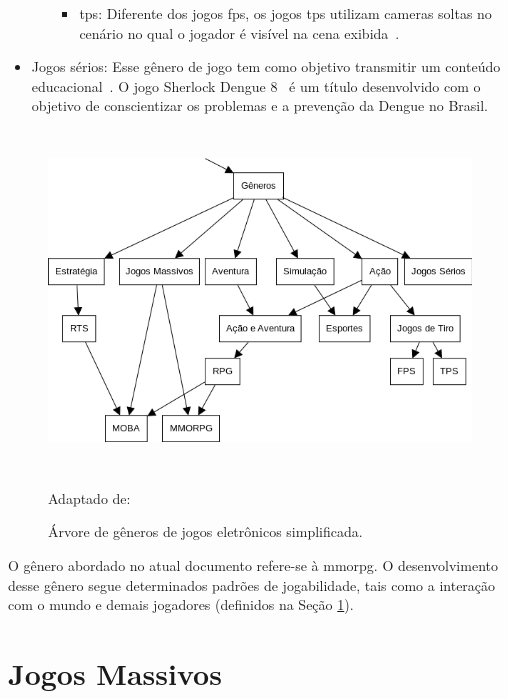 \begin{itemize}
\begin{itemize}
\begin{itemize}
          \item \ac{tps}: Diferente dos jogos \ac{fps}, os jogos \ac{tps} utilizam cameras soltas no cenário no qual o jogador é visível na cena exibida~\cite{video_game_technologies, adams_1208533}.
        \end{itemize}
    \end{itemize}
  \item Jogos sérios: Esse gênero de jogo tem como objetivo transmitir um conteúdo educacional~\cite{video_game_technologies}. O jogo Sherlock Dengue 8~\cite{sherlock_dengue} é um título desenvolvido com o objetivo de conscientizar os problemas e a prevenção da Dengue no Brasil.
\end{itemize}



\begin{figure}[htb!]
\caption{Árvore de gêneros de jogos eletrônicos simplificada.}
\label{fig:generos}
\includegraphics[height=9cm]{img/cap2/generos.png}
\centering

Adaptado de:~\cite{adams_1208533}
\end{figure}



O gênero abordado no atual documento refere-se à \ac{mmorpg}.
%
O desenvolvimento desse gênero segue determinados padrões de jogabilidade, tais como a interação com o mundo e demais jogadores (definidos na Seção \ref{sec:mmorpg}).



\section{Jogos Massivos}
\label{sec:mmorpg}



